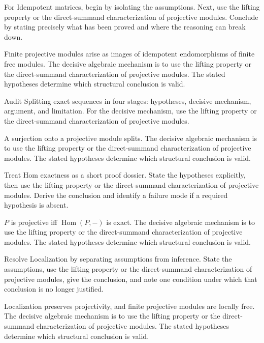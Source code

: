 \begin{problem}\label{prob:v13-problem-05}
For Idempotent matrices, begin by isolating the assumptions. Next, use the lifting property or the direct-summand characterization of projective modules. Conclude by stating precisely what has been proved and where the reasoning can break down.
\end{problem}
\begin{solution}
Finite projective modules arise as images of idempotent endomorphisms of finite free modules. The decisive algebraic mechanism is to use the lifting property or the direct-summand characterization of projective modules. The stated hypotheses determine which structural conclusion is valid.
\end{solution}

\begin{problem}\label{prob:v13-problem-06}
Audit Splitting exact sequences in four stages: hypotheses, decisive mechanism, argument, and limitation. For the decisive mechanism, use the lifting property or the direct-summand characterization of projective modules.
\end{problem}
\begin{solution}
A surjection onto a projective module splits. The decisive algebraic mechanism is to use the lifting property or the direct-summand characterization of projective modules. The stated hypotheses determine which structural conclusion is valid.
\end{solution}

\begin{problem}\label{prob:v13-problem-07}
Treat Hom exactness as a short proof dossier. State the hypotheses explicitly, then use the lifting property or the direct-summand characterization of projective modules. Derive the conclusion and identify a failure mode if a required hypothesis is absent.
\end{problem}
\begin{solution}
$P$ is projective iff $\operatorname{Hom}(P,-)$ is exact. The decisive algebraic mechanism is to use the lifting property or the direct-summand characterization of projective modules. The stated hypotheses determine which structural conclusion is valid.
\end{solution}

\begin{problem}\label{prob:v13-problem-08}
Resolve Localization by separating assumptions from inference. State the assumptions, use the lifting property or the direct-summand characterization of projective modules, give the conclusion, and note one condition under which that conclusion is no longer justified.
\end{problem}
\begin{solution}
Localization preserves projectivity, and finite projective modules are locally free. The decisive algebraic mechanism is to use the lifting property or the direct-summand characterization of projective modules. The stated hypotheses determine which structural conclusion is valid.
\end{solution}


